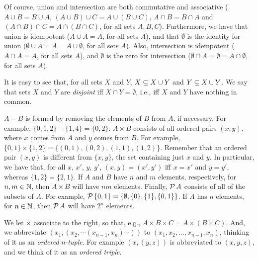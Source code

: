 Of course, union and intersection are both commutative
%
%
%
%
and associative
%
%
%
%
($A\cup B=B\cup A$, $(A\cup B)\cup C=A\cup
(B\cup C)$, $A\cap B=B\cap A$ and $(A\cap B)\cap C=A\cap (B\cap C)$,
for all sets $A, B, C$).
Furthermore, we have that union is idempotent
%
%
($A\cup A=A$, for all
sets $A$), and that $\emptyset$ is the identity
%
%
for union ($\emptyset\cup A=A=A\cup\emptyset$, for all sets $A$).
Also, intersection is idempotent
%
%
($A\cap A=A$, for all sets $A$), and
$\emptyset$ is the zero
%
%
for intersection ($\emptyset\cap
A=\emptyset=A\cap\emptyset$, for all sets $A$).

It is easy to see that, for all sets $X$ and $Y$,
$X\subseteq X\cup Y$ and $Y\subseteq X\cup Y$. We say that sets $X$ and
$Y$ are \emph{disjoint} iff $X\cap Y=\emptyset$, i.e., iff
%
%
$X$ and $Y$ have nothing in common.

$A-B$ is formed by removing the elements of $B$ from $A$, if
necessary.  For example, $\{0,1,2\}-\{1,4\}=\{0,2\}$.
$A\times B$ consists of all ordered pairs $(x,y)$,
%
%
where $x$ comes from $A$ and $y$ comes from $B$.  For example,
$\{0,1\}\times\{1,2\}=\{(0,1),(0,2),(1,1),(1,2)\}$.  Remember that an
ordered pair $(x,y)$ is different from $\{x,y\}$, the set containing
just $x$ and $y$.  In particular, we have that, for all
$x$, $x'$, $y$, $y'$, $(x,y)=(x',y')$ iff
$x=x'$ and $y=y'$, whereas $\{1,2\}=\{2,1\}$.
If $A$ and $B$ have $n$ and $m$ elements, respectively, for
$n,m\in\mathbb{N}$, then $A\times B$ will have $nm$ elements.  Finally,
${\cal P} \,A$ consists of all of the subsets of $A$.  For example,
${\cal P} \,\{0,1\}=\{\emptyset,\{0\},\{1\},\{0,1\}\}$.  If $A$ has $n$
elements, for $n\in\mathbb{N}$, then ${\cal P} \,A$ will have $2^n$ elements.

We let $\times$ associate to the right, so that, e.g.,
%
%
$A\times B\times C = A\times(B\times C)$.  And, we abbreviate
$(x_1,(x_2,\cdots(x_{n-1},x_n)\cdots))$ to
$(x_1,x_2,\ldots,x_{n-1},x_n)$, thinking of it as an \emph{ordered}
$n$-\emph{tuple}.
%
For example
$(x,(y,z))$ is abbreviated to $(x,y,z)$, and we think of it
as an \emph{ordered triple}.
%
%

